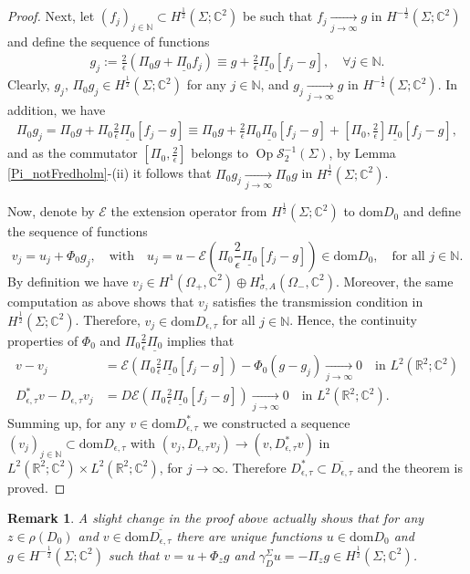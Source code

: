 \documentclass[11pt,a4paper,reqno,oneside]{amsproc}
\DeclareMathOperator{\dom}{dom}
\DeclareMathOperator{\Op}{Op}
\newcommand{\cS}{\mathcal{S}}
\def \rr {{\mathbb R}}
\def \cc {{\mathbb C}}
\def \nn {{\mathbb N}}
\numberwithin{equation}{section}
\def\dom{\mathrm{dom}}
\def \cc {{\mathbb{C}}}
\newtheorem{remark}[definition]{Remark}
\begin{document}
\begin{proof}
Next, let $(f_j)_{j\in\nn}\subset H^{\frac{1}{2}}(\Sigma;\cc^2)$ be such that $f_j \xrightarrow[j\to\infty]{} g$ in $H^{-\frac{1}{2}}(\Sigma;\cc^2)$ and define the sequence of functions
 \begin{align*}%
  g_j:= \frac{2}{\epsilon} (\Pi_0g +\underline{\Pi_0} f_j )\equiv g +\frac{2}{\epsilon}  \underline{\Pi_0}[f_j - g],\quad\forall j\in\mathbb{N}.
  \end{align*}
Clearly, $g_j,\, \Pi_0g_j\in H^{\frac{1}{2}}(\Sigma;\cc^2)$ for any $j\in\nn$, and $g_j \xrightarrow[j\to\infty]{} g$ in $H^{-\frac{1}{2}}(\Sigma;\cc^2)$. In addition, we have
\begin{align*}%
\Pi_0	g_j= \Pi_0g +\Pi_0\frac{2}{\epsilon}  \underline{\Pi_0}[f_j - g]\equiv \Pi_0g  +\frac{2}{\epsilon}\Pi_0  \underline{\Pi_0}[f_j - g]  +[\Pi_0,\frac{2}{\epsilon}]  \underline{\Pi_0}[f_j - g],
\end{align*}
and as the commutator  $[\Pi_0,\frac{2}{\epsilon}]$ belongs to $\Op \cS^{-1}_2(\Sigma)$, by Lemma \ref{Pi_notFredholm}-(ii) it follows that $\Pi_0 g_j \xrightarrow[j\to\infty]{} \Pi_0 g$ in $H^{\frac{1}{2}}(\Sigma;\cc^2)$. 


Now, denote by $\mathcal E$ the extension operator from  $ H^{\frac{1}{2}}(\Sigma;\cc^2)$ to  $ \dom D_{0}$ and define the sequence of functions
\[
v_j= u_j +\Phi_0 g_j, \quad\text{with}\quad u_j= u- \mathcal{E}\left(\Pi_0 \frac{2}{\epsilon} \underline{\Pi_0}[f_j-g]\right) \in \dom D_{0}, \quad \text{for all } j\in\nn.
\]  
By definition we have $v_j\in H^1(\Omega_+,\cc^2)\oplus H^1_{\sigma, A}(\Omega_-,\cc^2)$. Moreover, the same computation as above shows that $v_j$ satisfies the transmission condition in $ H^{\frac{1}{2}}(\Sigma;\cc^2)$. Therefore,  $v_j\in \dom D_{\epsilon,\tau}$ for all $j\in\nn$. Hence, the continuity properties of $\Phi_0$ and $\Pi_0\frac{2}{\epsilon}\underline{\Pi_0}$ implies that 
\begin{align*}
v- v_j&= \mathcal{E}\left(\Pi_0 \frac{2}{\epsilon} \underline{\Pi_0}[f_j-g]\right) - \Phi_0(g- g_j) \xrightarrow[j\to\infty]{}0 \quad \text{in } L^2(\rr^2;\cc^2)\\
D^\ast_{\epsilon,\tau}v- D_{\epsilon,\tau}v_j&= D\mathcal{E}\left(\Pi_0 \frac{2}{\epsilon} \underline{\Pi_0}[f_j-g]\right) \xrightarrow[j\to\infty]{}0 \quad \text{in } L^2(\rr^2;\cc^2).
\end{align*}
Summing up, for any $v\in \dom D^\ast_{\epsilon,\tau}$ we constructed a sequence $(v_j)_{j\in\nn}\subset \dom D_{\epsilon,\tau}$ with $(v_j, D_{\epsilon,\tau}v_j) \to(v, D^\ast_{\epsilon,\tau}v)$  in $L^2(\rr^2;\cc^2)\times L^2(\rr^2;\cc^2)$, for $j\to\infty$. Therefore $ D^{\ast}_{\epsilon,\tau}\subset\overline{D_{\epsilon,\tau}}$ and the theorem is proved. 
\end{proof}
\begin{remark}\label{Remark decomp} A slight change in the proof above actually shows that for any $z\in\rho(D_0)$ and $v\in\dom \overline{D_{\epsilon,\tau}}$ there are unique functions $u\in\dom D_0$ and $g\in H^{-\frac{1}{2}}(\Sigma;\cc^2)$ such that $v= u+ \Phi_z g$ and $\gamma_D^\Sigma u=-\Pi_z g \in H^{\frac{1}{2}}(\Sigma;\cc^2)$.
\end{remark}
\end{document}
